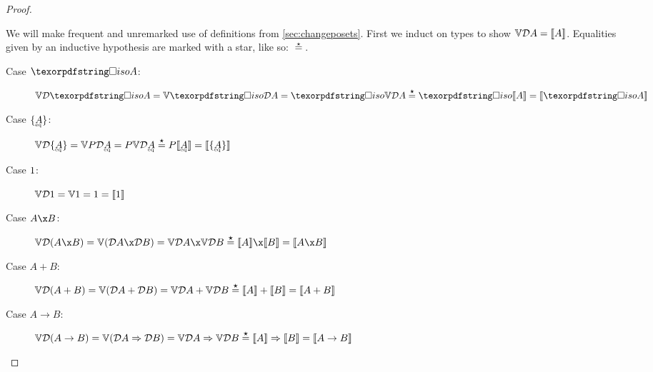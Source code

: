 \documentclass{rntz}\usepackage{fantasy}%
\begin{document}
\thmForget*
\begin{proof}\label{proof:forget}

  We will make frequent and unremarked use of definitions from
  \cref{sec:changeposets}. First we induct on types to show $\mathbb{V}{\mathcal{D} A} =
  \llbracket{A}\rrbracket$. Equalities given by an inductive hypothesis are marked with a star,
  like so: $\stareq$.

  \begin{description}
    \item[Case $\isof A$:] \(\vals{\incdens{\isof A}}
      = \vals{\discof{\incdens A}}
      = \isof{\vals{\incdens A}} \stareq \isof{\den A}
      = \den{\isof A} \)


    \item[Case $\tset{\eqt A}$:]
      \(\vals{\incdens{\tset{\eqt A}}}
      = \vals{\pfinof{\incdens{\eqt A}}}
      = \pfinof{\vals{\incdens{\eqt A}}}
      \stareq \pfinof{\den{\eqt A}}
      = \den{\tset{\eqt A}} \)


    \item[Case $1$:] \(\mathbb{V}{\mathcal{D} 1} = \mathbb{V}1 = 1 = \llbracket{1}\rrbracket\)

    \item[Case $A \x B$:] \(\vals{\incden{A \x B}}
      = \vals{(\incdens A \x \incdens B)}
      = \vals{\incdens A} \x \vals{\incdens B}
      \stareq \den{A} \x \den{B}
      = \den{A \x B} \)

    \item[Case $A + B$:] \(\mathbb{V}{\mathcal{D}({A + B})}
      = \mathbb{V}{(\mathcal{D} A + \mathcal{D} B)}
      = \mathbb{V}{\mathcal{D} A} + \mathbb{V}{\mathcal{D} B}
      \overset{\boldsymbol\star}{=} \llbracket{A}\rrbracket + \llbracket{B}\rrbracket
      = \llbracket{A + B}\rrbracket
      \)

    \item[Case $A \to B$:] \(\mathbb{V}{\mathcal{D}({A \to B})}
      = \mathbb{V}{(\mathcal{D} A \Rightarrow \mathcal{D} B)}
      = \mathbb{V}\mathcal{D} A \Rightarrow \mathbb{V}\mathcal{D} B
      \overset{\boldsymbol\star}{=} \llbracket{A}\rrbracket \Rightarrow \llbracket{B}\rrbracket
      = \llbracket{A \to B}\rrbracket
      \)
  \end{description}


\end{proof}
\end{document}
